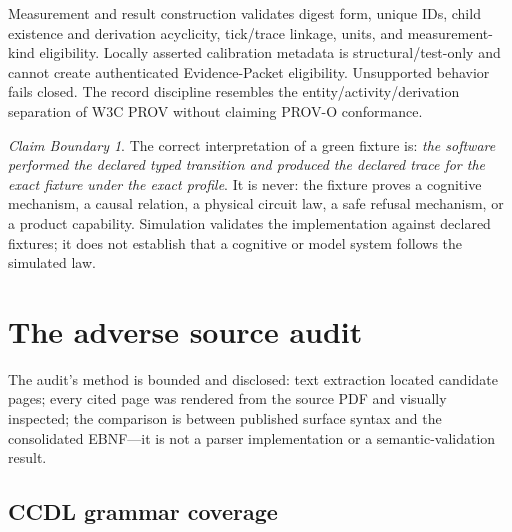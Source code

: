 \documentclass[11pt]{amsart}
\theoremstyle{definition}
\theoremstyle{remark}
\newtheorem{boundary}[theorem]{Claim Boundary}
\begin{document}
Measurement and result construction validates digest form, unique IDs, child existence and derivation acyclicity, tick/trace linkage, units, and measurement-kind eligibility. Locally asserted calibration metadata is structural/test-only and cannot create authenticated Evidence-Packet eligibility. Unsupported behavior fails closed. The record discipline resembles the entity/activity/derivation separation of W3C PROV \cite{prov} without claiming PROV-O conformance.

\begin{boundary}
The correct interpretation of a green fixture is: \emph{the software performed the declared typed transition and produced the declared trace for the exact fixture under the exact profile}. It is never: the fixture proves a cognitive mechanism, a causal relation, a physical circuit law, a safe refusal mechanism, or a product capability. Simulation validates the implementation against declared fixtures; it does not establish that a cognitive or model system follows the simulated law.
\end{boundary}

\section{The adverse source audit}\label{sec:audit}

The audit's method is bounded and disclosed: text extraction located candidate pages; every cited page was rendered from the source PDF and visually inspected; the comparison is between published surface syntax and the consolidated EBNF---it is not a parser implementation or a semantic-validation result.

\subsection{CCDL grammar coverage}
\end{document}
